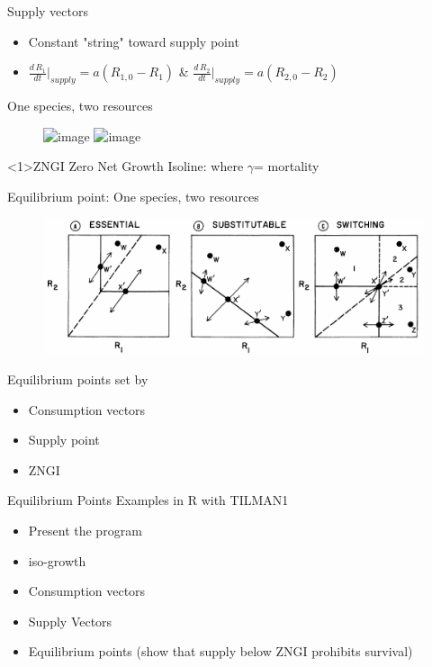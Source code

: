 \documentclass[final,xcolor=dvipsnames]{beamer}
\begin{document}
\begin{frame}{Supply vectors}
{   \begin{itemize}
   \item Constant "string" toward supply point
   \item $\frac{d\,R_1}{dt}|_{supply}= a(R_{1,0}-R_1)$ \& $\frac{d\,R_2}{dt}|_{supply}= a(R_{2,0}-R_2)$
   \end{itemize}
}
\end{frame}

\begin{frame}{One species, two resources}  
\begin{figure}
       \includegraphics<1>[width=.5\framewidth]{ZNGIss}
       \includegraphics<2>[width=.5\framewidth]{Eq} 
   \end{figure} 
\begin{block}<1>{ZNGI}
Zero Net Growth Isoline: where $\gamma$= mortality
\end{block}
\end{frame}

\begin{frame}{Equilibrium point: One species, two resources}  
	\begin{figure}
       \includegraphics[width=.8\framewidth]{ZNGI}
    \end{figure}
    Equilibrium points set by 
  \begin{itemize}
  \item Consumption vectors
  \item Supply point
  \item ZNGI
  \end{itemize}
\end{frame}


\begin{frame}{Equilibrium Points}  
Examples in R with TILMAN1
\begin{itemize}
\item Present the program
\item iso-growth
\item Consumption vectors
\item Supply Vectors
\item Equilibrium points (show that supply below ZNGI prohibits survival)
\end{itemize}
\end{frame}
\end{document}
